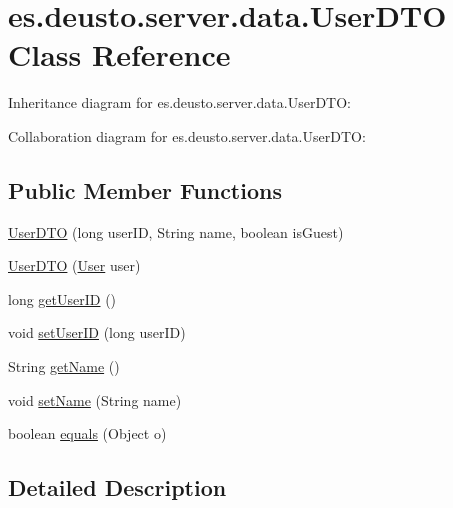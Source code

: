 \hypertarget{classes_1_1deusto_1_1server_1_1data_1_1_user_d_t_o}{}\section{es.\+deusto.\+server.\+data.\+User\+D\+TO Class Reference}
\label{classes_1_1deusto_1_1server_1_1data_1_1_user_d_t_o}


Inheritance diagram for es.\+deusto.\+server.\+data.\+User\+D\+TO\+:


Collaboration diagram for es.\+deusto.\+server.\+data.\+User\+D\+TO\+:
\subsection*{Public Member Functions}
\begin{DoxyCompactItemize}
\item 
\mbox{\hyperlink{classes_1_1deusto_1_1server_1_1data_1_1_user_d_t_o_a00e605694b6157bcf7a1acc5e2adc735}{User\+D\+TO}} (long user\+ID, String name, boolean is\+Guest)
\item 
\mbox{\hyperlink{classes_1_1deusto_1_1server_1_1data_1_1_user_d_t_o_ab05044a5b24bdbdcc1bbe582b7268b71}{User\+D\+TO}} (\mbox{\hyperlink{classes_1_1deusto_1_1server_1_1jdo_1_1_user}{User}} user)
\item 
long \mbox{\hyperlink{classes_1_1deusto_1_1server_1_1data_1_1_user_d_t_o_ae04b78d874974f7f3307b68fa2a15210}{get\+User\+ID}} ()
\item 
void \mbox{\hyperlink{classes_1_1deusto_1_1server_1_1data_1_1_user_d_t_o_ad96e17b7c2a478f263f7a7b8bf7dde14}{set\+User\+ID}} (long user\+ID)
\item 
String \mbox{\hyperlink{classes_1_1deusto_1_1server_1_1data_1_1_user_d_t_o_a3e5416e48bbbd923f0d23b87f02e3aaf}{get\+Name}} ()
\item 
void \mbox{\hyperlink{classes_1_1deusto_1_1server_1_1data_1_1_user_d_t_o_a15f7773676e2cca068e63f604fb61ab0}{set\+Name}} (String name)
\item 
boolean \mbox{\hyperlink{classes_1_1deusto_1_1server_1_1data_1_1_user_d_t_o_a2963ea7c4e6ae150e958abc1f0ce2bbb}{equals}} (Object o)
\end{DoxyCompactItemize}


\subsection{Detailed Description}


